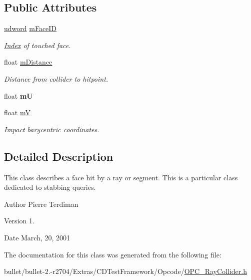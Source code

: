 \subsection*{Public Attributes}
\begin{DoxyCompactItemize}
\item 
\hypertarget{class_collision_face_a2699f1cef97a7624e06fdfd12a03a387}{\hyperlink{_ice_types_8h_a44c6f1920ba5551225fb534f9d1a1733}{udword} \hyperlink{class_collision_face_a2699f1cef97a7624e06fdfd12a03a387}{m\+Face\+I\+D}}\label{class_collision_face_a2699f1cef97a7624e06fdfd12a03a387}

\begin{DoxyCompactList}\small\item\em \hyperlink{struct_index}{Index} of touched face. \end{DoxyCompactList}\item 
\hypertarget{class_collision_face_a82300f037805abb4a6cf673853162408}{float \hyperlink{class_collision_face_a82300f037805abb4a6cf673853162408}{m\+Distance}}\label{class_collision_face_a82300f037805abb4a6cf673853162408}

\begin{DoxyCompactList}\small\item\em Distance from collider to hitpoint. \end{DoxyCompactList}\item 
\hypertarget{class_collision_face_af85ee469ff2819f0ce67fa51feee61d4}{float {\bfseries m\+U}}\label{class_collision_face_af85ee469ff2819f0ce67fa51feee61d4}

\item 
\hypertarget{class_collision_face_aaf93812d02c2e878a5d35f8f3068881d}{float \hyperlink{class_collision_face_aaf93812d02c2e878a5d35f8f3068881d}{m\+V}}\label{class_collision_face_aaf93812d02c2e878a5d35f8f3068881d}

\begin{DoxyCompactList}\small\item\em Impact barycentric coordinates. \end{DoxyCompactList}\end{DoxyCompactItemize}


\subsection{Detailed Description}
This class describes a face hit by a ray or segment. This is a particular class dedicated to stabbing queries.

\begin{DoxyAuthor}{Author}
Pierre Terdiman 
\end{DoxyAuthor}
\begin{DoxyVersion}{Version}
1. 
\end{DoxyVersion}
\begin{DoxyDate}{Date}
March, 20, 2001 
\end{DoxyDate}


The documentation for this class was generated from the following file\+:\begin{DoxyCompactItemize}
\item 
bullet/bullet-\/2.-\/r2704/\+Extras/\+C\+D\+Test\+Framework/\+Opcode/\hyperlink{_o_p_c___ray_collider_8h}{O\+P\+C\+\_\+\+Ray\+Collider.\+h}\end{DoxyCompactItemize}

